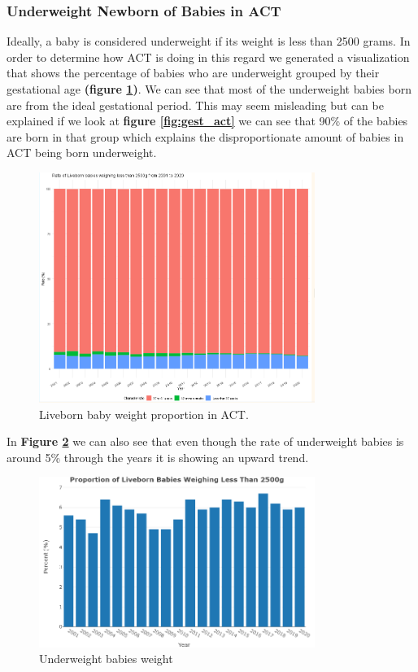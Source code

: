 \subsubsection{Underweight Newborn of Babies in ACT}
Ideally, a baby is considered underweight if its weight is less than 2500 grams. In order to determine how ACT is doing in this regard we generated a visualization that shows the percentage of babies who are underweight grouped by their gestational age \textbf{(figure \ref{fig:weight_gest})}. We can see that most of the underweight babies born are from the ideal gestational period. This may seem misleading but can be explained if we look at \textbf{figure \ref{fig:gest_act}} we can see that 90\% of the babies are born in that group which explains the disproportionate amount of babies in ACT being born underweight.

\begin{figure}
  \centering
  \includegraphics[width=0.8\textwidth]{subsections/baby_health/live_born_weigh_proportion_act.png}
  \caption{Liveborn baby weight proportion in ACT.}
  \label{fig:weight_gest}
\end{figure}

In \textbf{Figure \ref{fig:weight_act}} we can also see that even though the rate of underweight babies is around 5\% through the years it is showing an upward trend.

\begin{figure}
  \centering
  \includegraphics[width=0.8\textwidth]{subsections/baby_health/liveborn_weight.png}
  \caption{Underweight babies weight}
  \label{fig:weight_act}
\end{figure}